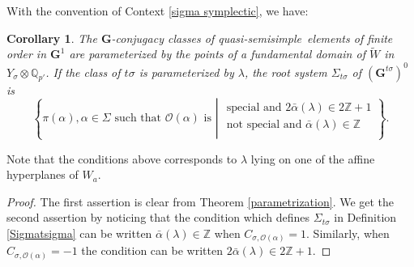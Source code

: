 \documentclass{amsart}
\newtheorem{corollary}[equation]{Corollary}
\numberwithin{equation}{section}
\theoremstyle{definition}
\theoremstyle{remark}
\newcommand\bG{{\mathbf G}}
\newcommand\bT{{\mathbf T}}
\newcommand\BQ{{\mathbb Q}}
\newcommand\BZ{{\mathbb Z}}
\newcommand\CO{{\mathcal O}}
\newcommand\Gun{{\bG^1}}
\newcommand\Gtso{{(\bG^{t\sigma})^0}}
\newcommand\tW{{\widetilde W}}
\newcommand\Wa{W_a}
\newcommand\qss{quasi-semisimple}
\begin{document}
With the convention of Context \ref{sigma symplectic}, we have:
\begin{corollary}\label{root system of Gtso2}
The $\bG$-conjugacy classes of \qss\ elements of finite order in
$\Gun$  are parameterized by the  points of a fundamental domain of
$\tW$ in $Y_\sigma\otimes\BQ_{p'}$. If the class of $t\sigma$ is parameterized
by $\lambda$, the root system $\Sigma_{t\sigma}$
of $\Gtso$ is 
$$\left\{\pi(\alpha), \alpha\in\Sigma\text{ such that $\CO(\alpha)$ is }
\left|
\begin{array}{l}
\text{ special and }2\bar\alpha(\lambda)\in 2\BZ+1\\
\text{ not special and }\bar\alpha(\lambda)\in\BZ\\
\end{array}\right.\right\}.$$
\end{corollary}
Note that the conditions above
corresponds to $\lambda$ lying on one of the affine hyperplanes of $\Wa$.
\begin{proof}
The first assertion is clear from Theorem \ref{parametrization}.
We get the second assertion by noticing that the
condition    which   defines   
$\Sigma_{t\sigma}$ in Definition \ref{Sigmatsigma}
can   be   written $\bar\alpha(\lambda)\in\BZ$  when
$C_{\sigma,\CO(\alpha)}=1$.
Similarly, when $C_{\sigma,\CO(\alpha)}=-1$ the condition can be written
$2\bar\alpha(\lambda)\in 2\BZ+1$.
\end{proof}
\end{document}
